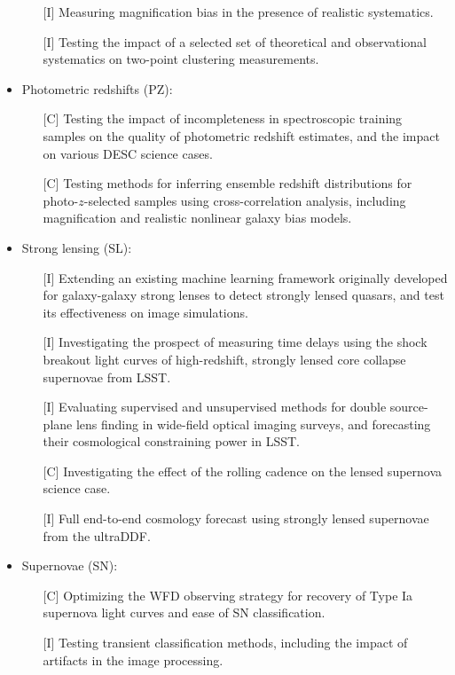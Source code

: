 \documentclass[preprint,times]{aastex61}
\begin{document}
\begin{itemize}
\begin{enumerate}
\item[{[I]}] Measuring magnification bias in the presence of realistic systematics.
\item[{[I]}] Testing the impact of a selected set of theoretical and observational systematics on two-point clustering measurements.
\end{enumerate}
\item Photometric redshifts (PZ):
\begin{enumerate}
\item[{[C]}] Testing the impact of incompleteness in spectroscopic training samples on the quality of photometric redshift estimates, and the impact on various DESC science cases.
\item[{[C]}] Testing methods for inferring ensemble redshift distributions for photo-$z$-selected samples using cross-correlation analysis, including magnification and realistic nonlinear galaxy bias models.
\end{enumerate}
\item Strong lensing (SL):
\begin{enumerate}
\item[{[I]}] Extending an existing machine learning framework originally developed for galaxy-galaxy strong lenses to detect strongly lensed quasars, and test its effectiveness on image simulations.
\item[{[I]}] Investigating the prospect of measuring time delays using the shock breakout light curves of  high-redshift, strongly lensed core collapse supernovae from LSST.
\item[{[I]}] Evaluating supervised and unsupervised methods for double source-plane lens finding in wide-field optical imaging surveys, and forecasting their cosmological constraining power in LSST.
\item[{[C]}] Investigating the effect of the rolling cadence on the lensed supernova science case.
\item[{[I]}]  Full end-to-end cosmology forecast using strongly lensed supernovae from the ultraDDF.
\end{enumerate}
\item Supernovae (SN):
\begin{enumerate}
\item[{[C]}] Optimizing the WFD observing strategy for recovery of Type Ia supernova light curves and ease of SN classification.
\item[{[I]}] Testing transient classification methods, including the impact of artifacts in the image processing.

\end{enumerate}
\end{itemize}
\end{document}
